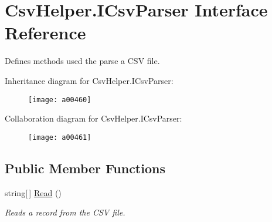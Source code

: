 \hypertarget{a00115}{\section{Csv\-Helper.\-I\-Csv\-Parser Interface Reference}
\label{a00115}
}


Defines methods used the parse a C\-S\-V file.  




Inheritance diagram for Csv\-Helper.\-I\-Csv\-Parser\-:
\nopagebreak
\begin{figure}[H]
\begin{center}
\leavevmode
\texttt{[image: a00460]}
\end{center}
\end{figure}


Collaboration diagram for Csv\-Helper.\-I\-Csv\-Parser\-:
\nopagebreak
\begin{figure}[H]
\begin{center}
\leavevmode
\texttt{[image: a00461]}
\end{center}
\end{figure}
\subsection*{Public Member Functions}
\begin{DoxyCompactItemize}
\item 
string\mbox{[}$\,$\mbox{]} \hyperlink{a00115_a411461b4cd33dce0b42c81715359f687}{Read} ()
\begin{DoxyCompactList}\small\item\em Reads a record from the C\-S\-V file. \end{DoxyCompactList}\end{DoxyCompactItemize}
